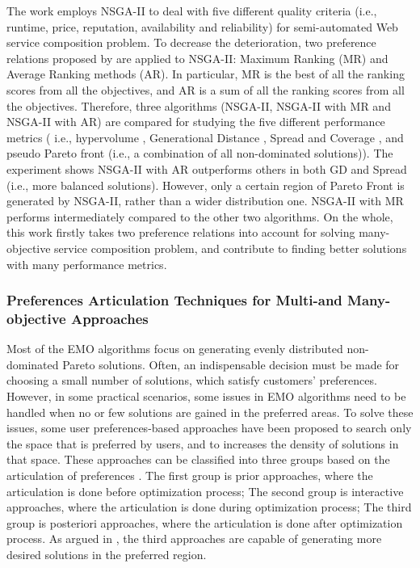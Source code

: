 The work \cite{de2010many} employs NSGA-II to deal with five different quality criteria (i.e., runtime, price, reputation, availability and reliability) for semi-automated Web service composition problem.  To decrease the deterioration, two preference relations proposed by \cite{bentley1997finding} are applied to NSGA-II: Maximum Ranking (MR) and Average Ranking methods (AR). In particular, MR is the best of all the ranking scores from all the objectives, and AR is a sum of all the ranking scores from all the objectives. Therefore, three algorithms (NSGA-II, NSGA-II with MR and NSGA-II with AR) are compared for studying the five different performance metrics ( i.e., hypervolume \cite{zitzler1999evolutionary}, Generational Distance \cite{van2000measuring}, Spread and Coverage \cite{zitzler2000comparison}, and pseudo Pareto front (i.e., a combination of all non-dominated solutions)). The experiment shows NSGA-II with AR outperforms others in both GD and Spread (i.e., more balanced solutions). However, only a certain region of Pareto Front is generated by NSGA-II, rather than a wider distribution one. NSGA-II with MR performs intermediately compared to the other two algorithms. On the whole, this work firstly takes two preference relations into account for solving many-objective service composition problem, and contribute to finding better solutions with many performance metrics.


\subsubsection{Preferences Articulation Techniques for Multi-and Many-objective Approaches}\label{PreferencesMultiObjective}
Most of the EMO algorithms focus on generating evenly distributed non-dominated Pareto solutions. Often, an indispensable decision must be made for choosing a small number of solutions, which satisfy customers' preferences. However, in some practical scenarios, some issues in EMO algorithms need to be handled when no or few solutions are gained in the preferred areas. To solve these issues, some user preferences-based approaches have been proposed to search only the space that is preferred by users, and to increases the density of solutions in that space. These approaches can be classified into three groups based on the articulation of preferences \cite{van2000multiobjective}. The first group is prior approaches, where the articulation is done before optimization process; The second group is interactive approaches, where the articulation is done during optimization process; The third group is posteriori approaches, where the articulation is done after optimization process. As argued in \cite{giagkiozis2014pareto}, the third approaches are capable of generating more desired solutions in the preferred region. 



